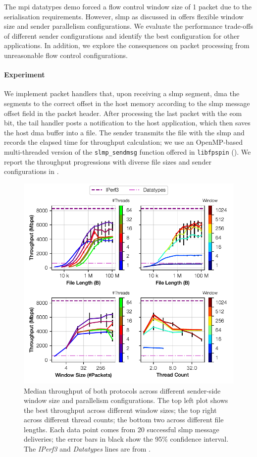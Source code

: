 The \ac{mpi} datatypes demo forced a flow control window size of 1 packet due to the serialisation requirements.  However, \ac{slmp} as discussed in  offers flexible window size and sender parallelism configurations.  We evaluate the performance trade-offs of different sender configurations and identify the best configuration for other applications.  In addition, we explore the consequences on packet processing from unreasonable flow control configurations.

\paragraph{Experiment} We implement packet handlers that, upon receiving a \ac{slmp} segment, \ac{dma} the segments to the correct offset in the host memory according to the \ac{slmp} message offset field in the packet header.  After processing the last packet with the \ac{eom} bit, the tail handler posts a notification to the host application, which then saves the host \ac{dma} buffer into a file.  The sender transmits the file with the \ac{slmp} and records the elapsed time for throughput calculation; we use an OpenMP-based multi-threaded version of the \texttt{slmp\_sendmsg} function offered in \texttt{libfpspin} ().  We report the throughput progressions with diverse file sizes and sender configurations in .

\begin{figure}[t]
    \centering
    \includegraphics{figures/slmp-tput.pdf}
    \caption{Median throughput of both protocols across different sender-side window size and parallelism configurations.  The top left plot shows the best throughput across different window sizes; the top right across different thread counts; the bottom two across different file lengths.  Each data point comes from 20 successful \ac{slmp} message deliveries; the error bars in black show the 95\% confidence interval.  The \emph{IPerf3} and \emph{Datatypes} lines are from .} \label{fig:slmp-tput}
\end{figure}

